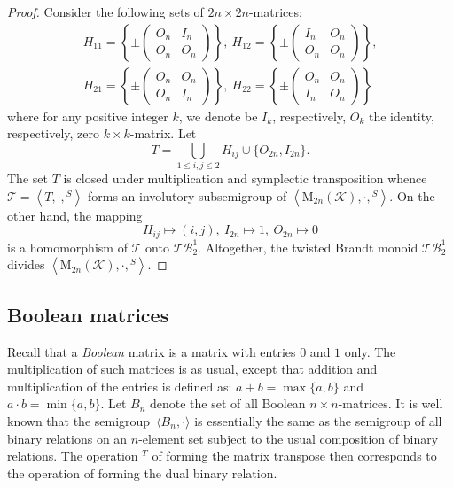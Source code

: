 \documentclass[11pt,reqno]{amsart}
\numberwithin{equation}{section}
\theoremstyle{remark}
\def\sm{semi\-group}
\begin{document}
\begin{proof} Consider the following sets of $2n\times 2n$-matrices:
\begin{gather*}
H_{11}=\left\{\pm \begin{pmatrix}O_n & I_n \\ O_n&O_n
\end{pmatrix}\right\},\
H_{12}=\left\{\pm \begin{pmatrix}I_n & O_n \\ O_n&O_n \end{pmatrix}\right\},\\
H_{21}=\left\{\pm \begin{pmatrix}O_n & O_n \\ O_n&I_n
\end{pmatrix}\right\},\
H_{22}=\left\{\pm \begin{pmatrix}O_n & O_n \\ I_n&O_n
\end{pmatrix}\right\}
\end{gather*}
where for any positive integer $k$, we denote be $I_k$,
respectively, $O_k$ the identity, respectively, zero $k\times
k$-matrix. Let
$$T=\bigcup_{1\le i,j\le 2}H_{ij}\cup \{O_{2n}, I_{2n}\}.$$
The set $T$ is closed under multiplication and symplectic
transposition whence $\mathcal{T}=\left<T,\cdot,{}^S\right>$ forms
an involutory subsemigroup of
$\left<\mathrm{M}_{2n}(\mathcal{K}),\cdot,{}^S\right>$. On the
other hand, the mapping
$$H_{ij}\mapsto (i,j),\ I_{2n}\mapsto 1,\ O_{2n}
\mapsto 0$$ is a homomorphism of $\mathcal{T}$ onto
$\mathcal{TB}^1_2$. Altogether, the twisted Brandt monoid
$\mathcal{TB}^1_2$ divides
$\left<\mathrm{M}_{2n}(\mathcal{K}),\cdot,{}^S\right>$.
\end{proof}

\subsection{Boolean matrices}
Recall that a \emph{Boolean} matrix is a matrix with entries $0$
and $1$ only. The multiplication of such matrices is as usual,
except that addition and multiplication of the entries is defined
as: $a+b=\max\{a,b\}$ and $a\cdot b=\min\{a,b\}$. Let $B_n$ denote
the set of all Boolean $n\times n$-matrices. It is well known that
the \sm\ $\langle B_n,\cdot\rangle$ is essentially the same as the
semigroup of all binary relations on an $n$-element set subject to
the usual composition of binary relations. The operation ${}^T$ of
forming the matrix transpose then corresponds to the operation of
forming the dual binary relation.
\end{document}
